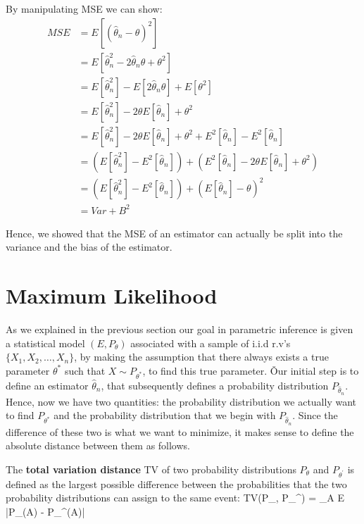 By manipulating MSE we can show:
\begin{align*}
MSE &= E[(\hat{\theta}_{n} - \theta)^2] \\
&= E[\hat{\theta}_{n}^2 - 2\hat{\theta}_{n}\theta + \theta^2] \\
&= E[\hat{\theta}_{n}^2] - E[2 \hat{\theta}_{n} \theta] + E[\theta^2] \\
&= E[\hat{\theta}_{n}^2] - 2 \theta E[\hat{\theta}_{n}] + \theta^2 \\
&= E[\hat{\theta}_{n}^2] - 2 \theta E[\hat{\theta}_{n}] + \theta^2 + E^2[\hat{\theta}_{n}] - E^2[\hat{\theta}_{n}] \\
&= (E[\hat{\theta}_{n}^2] - E^2[\hat{\theta}_{n}]) + (E^2[\hat{\theta}_{n}] - 2 \theta E[\hat{\theta}_{n}] + \theta^2)
\\
&= (E[\hat{\theta}_{n}^2] - E^2[\hat{\theta}_{n}]) + (E[\hat{\theta}_{n}] - \theta)^2 \\
&= Var + B^2
\end{align*}

Hence, we showed that the MSE of an estimator can actually be split into the variance and the bias of the estimator.

\section{Maximum Likelihood}

As we explained in the previous section our goal in parametric inference is given a statistical model $(E,
P_{\theta})$ associated with a sample of i.i.d r.v's $\{ X_{1}, X_{2}, \ldots, X_{n} \}$, by making the assumption
that there always exists a true parameter $\theta^{*}$ such that $X \sim P_{\theta^{*}}$, to find this true parameter.
\v

Our initial step is to define an estimator $\hat{\theta}_{n}$, that subsequently defines a probability distribution
$P_{\hat{\theta}_{n}}$. Hence, now we have two quantities: the probability distribution we actually want to find
$P_{\theta^{*}}$ and the probability distribution that we begin with $P_{\hat{\theta}_{n}}$. Since the difference of
these two is what we want to minimize, it makes sense to define the absolute distance between them as follows.

The \textbf{total variation distance} TV of two probability distributions $P_{\theta}$ and $P_{\theta^{\prime}}$ is
defined as the largest possible difference between the probabilities that the two probability distributions can
assign to the same event:
\bse
TV(P_{\theta}, P_{\theta}^{\prime}) = \max_{A \subseteq E} |P_{\theta}(A) - P_{\theta}^{\prime}(A)|
\ese
\ed

